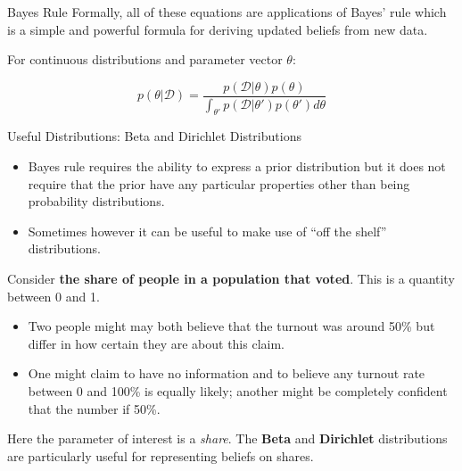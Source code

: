 \documentclass[
  11pt,
  ignorenonframetext,
]{beamer}
\providecommand{\tightlist}{%
  \setlength{\itemsep}{0pt}\setlength{\parskip}{0pt}}\usepackage{longtable,booktabs,array}
\begin{document}
\begin{frame}{Bayes Rule}
\protect\hypertarget{bayes-rule-2}{}
Formally, all of these equations are applications of Bayes' rule which
is a simple and powerful formula for deriving updated beliefs from new
data.

For continuous distributions and parameter vector \(\theta\):

\[p(\theta|\mathcal{D})=\frac{p(\mathcal{D}|\theta)p(\theta)}{\int_{\theta'}p(\mathcal{D|\theta'})p(\theta')d\theta}\]
\end{frame}

\begin{frame}{Useful Distributions: Beta and Dirichlet Distributions}
\protect\hypertarget{useful-distributions-beta-and-dirichlet-distributions}{}
\begin{itemize}
\tightlist
\item
  Bayes rule requires the ability to express a prior distribution but it
  does not require that the prior have any particular properties other
  than being probability distributions.
\item
  Sometimes however it can be useful to make use of ``off the shelf''
  distributions.
\end{itemize}

Consider \textbf{the share of people in a population that voted}. This
is a quantity between 0 and 1.

\begin{itemize}
\tightlist
\item
  Two people might may both believe that the turnout was around 50\% but
  differ in how certain they are about this claim.
\item
  One might claim to have no information and to believe any turnout rate
  between 0 and 100\% is equally likely; another might be completely
  confident that the number if 50\%.
\end{itemize}

Here the parameter of interest is a \emph{share}. The \textbf{Beta} and
\textbf{Dirichlet} distributions are particularly useful for
representing beliefs on shares.
\end{frame}
\end{document}
